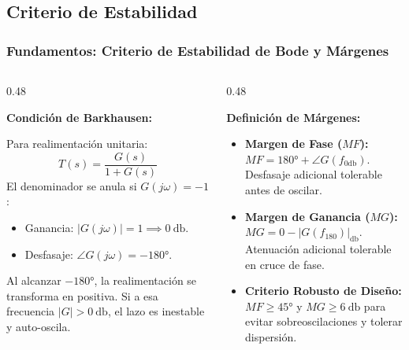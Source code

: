 \documentclass[aspectratio=169, 10pt]{beamer}
\begin{document}
\subsection{Criterio de Estabilidad}
\begin{frame}
  \frametitle{Fundamentos: Criterio de Estabilidad de Bode y Márgenes}

  \begin{columns}[t, onlytextwidth]
    \begin{column}{0.48\textwidth}
      \begin{tarjeta}
        {\fontsize{9pt}{10.5pt}\selectfont \textbf{\color{NavyDark} Condición de Barkhausen:}}\\[2pt]
        {\fontsize{7.5pt}{9pt}\selectfont
        Para realimentación unitaria:
        \[ T(s) = \frac{G(s)}{1 + G(s)} \]
        El denominador se anula si $G(j\omega) = -1$:
        \begin{itemize}\setlength{\itemsep}{1.5pt}
          \item Ganancia: $|G(j\omega)| = 1 \implies \qty{0}{\decibel}$.
          \item Desfasaje: $\angle G(j\omega) = \ang{-180}$.
        \end{itemize}
        Al alcanzar $\ang{-180}$, la realimentación se transforma en positiva. Si a esa frecuencia $|G| > \qty{0}{\decibel}$, el lazo es inestable y auto-oscila.
        }
      \end{tarjeta}
    \end{column}

    \begin{column}{0.48\textwidth}
      \begin{tarjeta}
        {\fontsize{9pt}{10.5pt}\selectfont \textbf{\color{NavyDark} Definición de Márgenes:}}\\[2pt]
        {\fontsize{7.5pt}{9pt}\selectfont
        \begin{itemize}\setlength{\itemsep}{2pt}
          \item \textbf{Margen de Fase ($MF$):}
          $MF = \ang{180} + \angle G(f_{0\si{\decibel}})$.\\
          Desfasaje adicional tolerable antes de oscilar.
          \item \textbf{Margen de Ganancia ($MG$):}
          $MG = 0 - |G(f_{180})|_{\si{\decibel}}$.\\
          Atenuación adicional tolerable en cruce de fase.
          \item \textbf{Criterio Robusto de Diseño:}
          $MF \ge \ang{45}$ y $MG \ge \qty{6}{\decibel}$ para evitar sobreoscilaciones y tolerar dispersión.
        \end{itemize}
        }
      \end{tarjeta}
    \end{column}
  \end{columns}
\end{frame}
\end{document}
